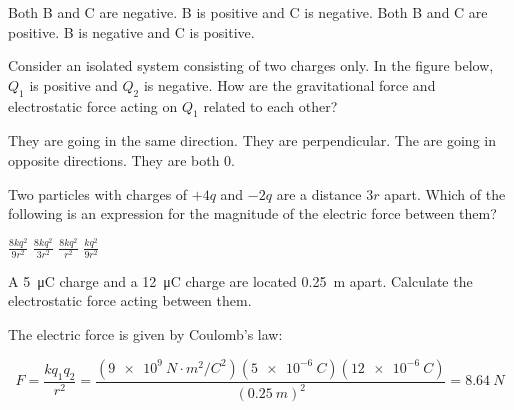 \documentclass[]{exam}
\begin{document}
\begin{questions}
\begin{randomizechoices}
    \correctchoice Both B and C are negative.
    \choice B is positive and C is negative.
    \choice Both B and C are positive.
    \choice B is negative and C is positive.
\end{randomizechoices}

\question
Consider an isolated system consisting of two charges only. In the figure below, $Q_1$ is positive and $Q_2$ is negative.  How are the gravitational force and electrostatic force acting on $Q_1$ related to each other?

\begin{minipage}{9cm}
\begin{randomizechoices}
    \correctchoice They are going in the same direction.
    \choice They are perpendicular.
    \choice The are going in opposite directions.
    \choice They are both 0.
\end{randomizechoices}
\end{minipage}
%
\begin{minipage}{3cm}
\centering
{}    
\end{minipage}

\question
Two particles with charges of $+4q$ and $-2q$ are a distance $3r$ apart. Which of the following is an expression for the magnitude of the electric force between them?
\smallskip

\begin{randomizeoneparchoices}
    \correctchoice $\displaystyle \frac{8kq^2}{9r^2}$
    \choice $\displaystyle \frac{8kq^2}{3r^2}$
    \choice $\displaystyle \frac{8kq^2}{r^2}$
    \choice $\displaystyle \frac{kq^2}{9r^2}$
\end{randomizeoneparchoices}

\question
A \SI{5}{\micro\coulomb} charge and a \SI{12}{\micro\coulomb} charge are located \SI{0.25}{m} apart. Calculate the electrostatic force acting between them.

\begin{solutionorbox}[4cm]
The electric force is given by Coulomb's law:

\begin{equation*}
    F = \frac{kq_1q_2}{r^2} = \frac{\left(\SI{9e9}{N\cdot m^2/C^2}\right)(\SI{5e-6}{C})(\SI{12e-6}{C})}{(\SI{0.25}{m})^2} = \boxed{\SI{8.64}{N}}
\end{equation*}
\end{solutionorbox}
\end{questions}
\end{document}

